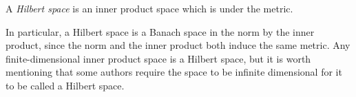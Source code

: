 \documentclass[12pt]{article}
\begin{document}
A \emph{Hilbert space} is an inner product space which is  under the  metric.

In particular, a Hilbert space is a Banach space in the norm  by the inner product, since the norm and the inner product both induce the same metric.  Any finite-dimensional inner product space is a Hilbert space, but it is worth mentioning that some authors require the space to be infinite dimensional for it to be called a Hilbert space.
\end{document}
